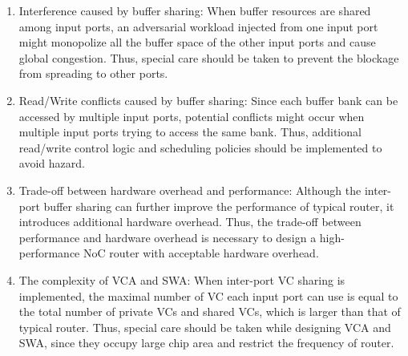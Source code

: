 \documentclass[10pt,conference]{IEEEtran}
\begin{document}
\begin{enumerate}
\item Interference caused by buffer sharing: When buffer resources are shared among input ports, an adversarial workload injected from one input port might monopolize all the buffer space of the other input ports and cause global congestion. Thus, special care should be taken to prevent the blockage from spreading to other ports.

\item Read/Write conflicts caused by buffer sharing: Since each buffer bank can be accessed by multiple input ports, potential conflicts might occur when multiple input ports trying to access the same bank. Thus, additional read/write control logic and scheduling policies should be implemented to avoid hazard.

\item Trade-off between hardware overhead and performance: Although the inter-port buffer sharing can further improve the performance of typical router, it introduces additional hardware overhead. Thus, the trade-off between performance and hardware overhead is necessary to design a high-performance NoC router with acceptable hardware overhead.

\item The complexity of VCA and SWA: When inter-port VC sharing is implemented, the maximal number of VC each input port can use is equal to the total number of private VCs and shared VCs, which is larger than that of typical router. Thus, special care should be taken while designing VCA and SWA, since they occupy large chip area and restrict the frequency of router.

\end{enumerate}
\end{document}
